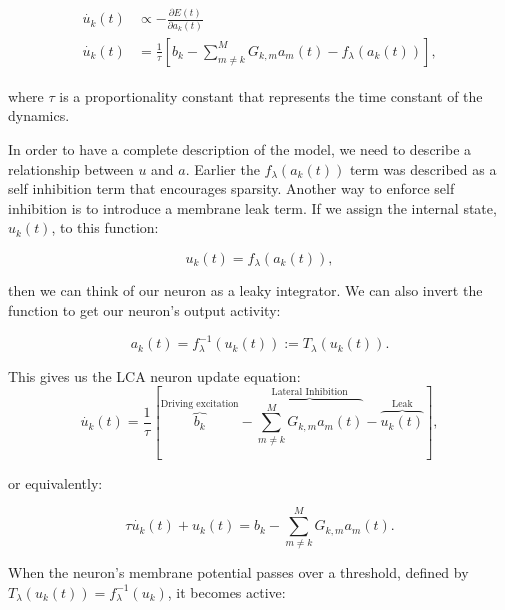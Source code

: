\begin{align}\label{eq:ch2_u_dot}
\begin{split}
    \dot{u_{k}}(t) &\propto - \frac{\partial E(t)} {\partial a_{k}(t)} \\
    \dot{u_{k}}(t) &= \frac{1}{\tau} \left[b_{k} - \sum_{m \neq k}^{M}G_{k,m}a_{m}(t) - f_{\lambda}(a_{k}(t)) \right],
\end{split}
\end{align}

\noindent where $\tau$ is a proportionality constant that represents the time constant of the dynamics.

In order to have a complete description of the model, we need to describe a relationship between $u$ and $a$. Earlier the $f_{\lambda}(a_{k}(t))$ term was described as a self inhibition term that encourages sparsity. Another way to enforce self inhibition is to introduce a membrane leak term. If we assign the internal state, $u_{k}(t)$, to this function:

\begin{equation}\label{eq:ch2_u_func_a}
    u_k(t) = f_{\lambda}(a_{k}(t)),
\end{equation}

\noindent then we can think of our neuron as a leaky integrator. We can also invert the function to get our neuron's output activity:

\begin{displaymath}\label{eq:ch2_a_fu_thresh}
    a_{k}(t) = f_{\lambda}^{-1}(u_{k}(t)) := T_{\lambda}(u_{k}(t)).
\end{displaymath}

This gives us the LCA neuron update equation:
\begin{equation}\label{eq:ch2_u_dot_full}
    \dot{u_{k}}(t) = \frac{1}{\tau} \left[\overbrace{b_{k}}^\text{Driving excitation} - \overbrace{\sum_{m \neq k}^{M}G_{k,m}a_{m}(t)}^\text{Lateral Inhibition} - \overbrace{u_{k}(t)}^\text{Leak} \right],
\end{equation}

\noindent or equivalently:

\begin{displaymath}
    \tau \dot{u_{k}}(t) + u_{k}(t) =  b_{k} - \sum_{m \neq k}^{M}G_{k,m}a_{m}(t).
\end{displaymath}

When the neuron's membrane potential passes over a threshold, defined by $T_{\lambda}(u_{k}(t)) = f_{\lambda}^{-1}(u_{k})$, it becomes active:

